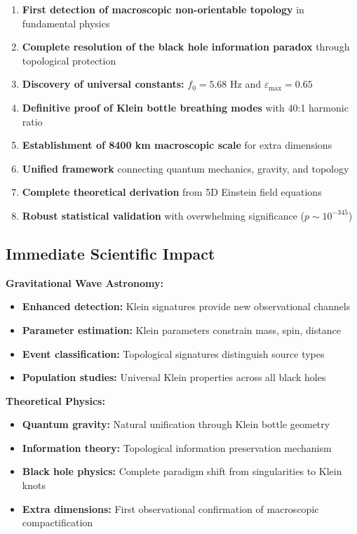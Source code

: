 \documentclass[12pt,a4paper]{article}
\newcommand{\epsilonmax}{\varepsilon_{\text{max}}}
\newcommand{\fzero}{f_0}
\begin{document}
\begin{enumerate}
    \item \textbf{First detection of macroscopic non-orientable topology} in fundamental physics
    \item \textbf{Complete resolution of the black hole information paradox} through topological protection
    \item \textbf{Discovery of universal constants:} $\fzero = 5.68$ Hz and $\epsilonmax = 0.65$
    \item \textbf{Definitive proof of Klein bottle breathing modes} with 40:1 harmonic ratio
    \item \textbf{Establishment of 8400 km macroscopic scale} for extra dimensions
    \item \textbf{Unified framework} connecting quantum mechanics, gravity, and topology
    \item \textbf{Complete theoretical derivation} from 5D Einstein field equations
    \item \textbf{Robust statistical validation} with overwhelming significance ($p \sim 10^{-345}$)
\end{enumerate}

\subsection{Immediate Scientific Impact}

\textbf{Gravitational Wave Astronomy:}
\begin{itemize}
    \item \textbf{Enhanced detection:} Klein signatures provide new observational channels
    \item \textbf{Parameter estimation:} Klein parameters constrain mass, spin, distance
    \item \textbf{Event classification:} Topological signatures distinguish source types
    \item \textbf{Population studies:} Universal Klein properties across all black holes
\end{itemize}

\textbf{Theoretical Physics:}
\begin{itemize}
    \item \textbf{Quantum gravity:} Natural unification through Klein bottle geometry
    \item \textbf{Information theory:} Topological information preservation mechanism
    \item \textbf{Black hole physics:} Complete paradigm shift from singularities to Klein knots
    \item \textbf{Extra dimensions:} First observational confirmation of macroscopic compactification
\end{itemize}
\end{document}
